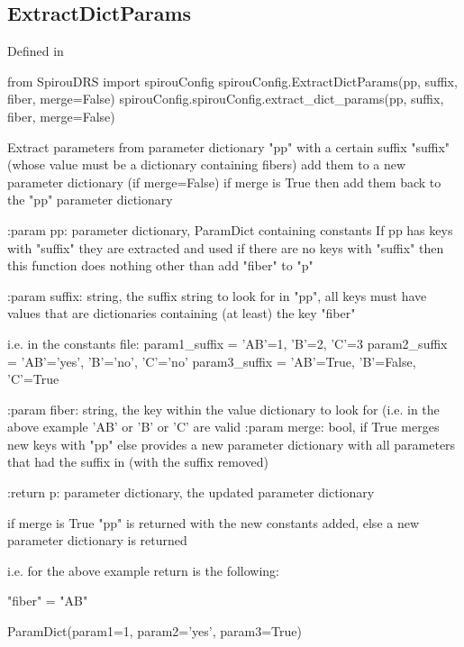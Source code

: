 \begin{minipage}{\textwidth}
\subsection{ExtractDictParams}

Defined in \spirouConfig{}

\begin{pythonbox}
from SpirouDRS import spirouConfig
spirouConfig.ExtractDictParams(pp, suffix, fiber, merge=False)
spirouConfig.spirouConfig.extract_dict_params(pp, suffix, fiber, merge=False)
\end{pythonbox}

\begin{pythondocstring}
Extract parameters from parameter dictionary "pp" with a certain suffix
"suffix" (whose value must be a dictionary containing fibers) add them
to a new parameter dictionary (if merge=False) if merge is True then
add them back to the "pp" parameter dictionary

:param pp: parameter dictionary, ParamDict containing constants
            If pp has keys with "suffix" they are extracted and used
            if there are no keys with "suffix" then this function does
            nothing other than add "fiber" to "p"

:param suffix: string, the suffix string to look for in "pp", all keys
               must have values that are dictionaries containing (at least)
               the key "fiber"

               i.e. in the constants file:
               param1_suffix = {'AB'=1, 'B'=2, 'C'=3}
               param2_suffix = {'AB'='yes', 'B'='no', 'C'='no'}
               param3_suffix = {'AB'=True, 'B'=False, 'C'=True}

:param fiber: string, the key within the value dictionary to look for
              (i.e. in the above example 'AB' or 'B' or 'C' are valid
:param merge: bool, if True merges new keys with "pp" else provides
              a new parameter dictionary with all parameters that had the
              suffix in (with the suffix removed)

:return p: parameter dictionary, the updated parameter dictionary

           if merge is True "pp" is returned with the new constants
           added, else a new parameter dictionary is returned

            i.e. for the above example return is the following:

                "fiber" = "AB"

           ParamDict(param1=1, param2='yes', param3=True)
\end{pythondocstring}
\end{minipage}

